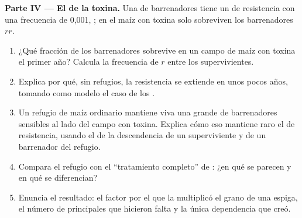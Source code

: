 \begin{problem}
\medskip
\noindent\textbf{Parte IV --- El  de la toxina.}
Una  de barrenadores tiene un  de resistencia con una
frecuencia de 0,001, ; en el maíz con toxina solo sobreviven
los barrenadores $rr$.
\begin{enumerate}[resume]
  \item ¿Qué fracción de los barrenadores sobrevive en un campo de maíz
        con toxina el primer año? Calcula la frecuencia de $r$ entre
        los supervivientes.
  \item Explica por qué, sin refugios, la resistencia se extiende en
        unos pocos años, tomando como modelo el caso de los
        .
  \item Un refugio de maíz ordinario mantiene viva una  grande
        de barrenadores sensibles al lado del campo con toxina. Explica
        cómo eso mantiene raro el  de resistencia, usando el
         de la descendencia de un superviviente  y de
        un barrenador del refugio.
  \item Compara el refugio con el ``tratamiento completo'' de
        : ¿en qué se parecen y en qué se diferencian?
  \item Enuncia el resultado: el factor por el que la 
        multiplicó el grano de una espiga, el número de 
        principales que hicieron falta y la única dependencia que creó.
\end{enumerate}
\end{problem}

